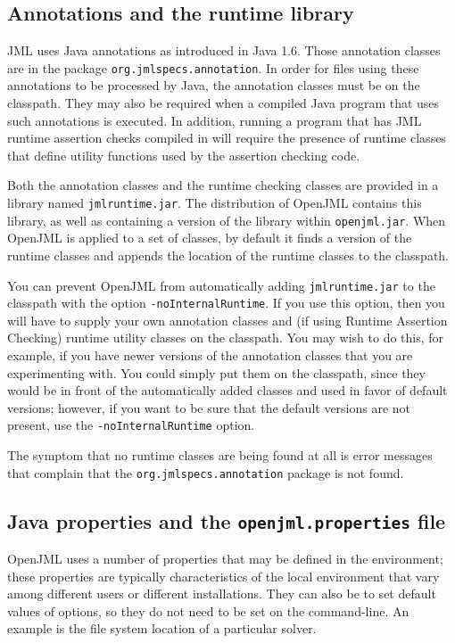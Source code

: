 \documentclass{report}%
\begin{document}
\subsection{Annotations and the runtime library}

JML uses Java annotations as introduced in Java 1.6. Those annotation classes are in the package
{\tt org.jmlspecs.annotation}. In order for files using these annotations to be processed by Java,
the annotation classes must be on the classpath. They may also be required when a compiled Java program
that uses such annotations is executed. In addition, running a program that has JML runtime assertion
checks compiled in will require the presence of runtime classes that define utility functions used by the assertion checking code.

Both the annotation classes and the runtime checking classes are provided in a library named {\tt jmlruntime.jar}.  The distribution of OpenJML contains this library, as well as containing a
version of the library within {\tt openjml.jar}. When OpenJML is applied to a set of classes, by default it finds a version of the runtime classes and appends the location of the runtime classes
to the classpath.

You can prevent OpenJML from automatically adding {\tt jmlruntime.jar} to the classpath with the
option {\tt -noInternalRuntime}. If you use this option, then you will have to supply your own
annotation classes and (if using Runtime Assertion Checking) runtime utility classes on the classpath. You may wish to do this, for example, if you have newer versions of the annotation
classes that you are experimenting with. You could simply put them on the classpath, since they
would be in front of the automatically added classes and used in favor of default versions;
however, if you want to be sure that the default versions are not present, use the {\tt -noInternalRuntime} option.

The symptom that no runtime classes are being found at all is error messages that complain that
the {\tt org.jmlspecs.annotation} package is not found.


\subsection{Java properties and the {\tt openjml.properties} file}

OpenJML uses a number of properties that may be defined in the environment;
these properties are typically characteristics of the local environment that vary among different users or different installations. 
They can also be to set default values of options, so they do not need to be set on the command-line. An example is the file system location of a particular solver.
\end{document}

